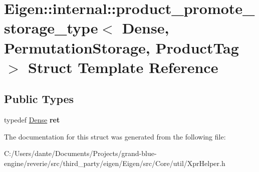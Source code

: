 \hypertarget{struct_eigen_1_1internal_1_1product__promote__storage__type_3_01_dense_00_01_permutation_storage_00_01_product_tag_01_4}{}\section{Eigen\+::internal\+::product\+\_\+promote\+\_\+storage\+\_\+type$<$ Dense, Permutation\+Storage, Product\+Tag $>$ Struct Template Reference}
\label{struct_eigen_1_1internal_1_1product__promote__storage__type_3_01_dense_00_01_permutation_storage_00_01_product_tag_01_4}
\subsection*{Public Types}
\begin{DoxyCompactItemize}
\item 
\mbox{\label{struct_eigen_1_1internal_1_1product__promote__storage__type_3_01_dense_00_01_permutation_storage_00_01_product_tag_01_4_a2140e11db80fe2c1eb76d7b791d1f7de}} 
typedef \mbox{\hyperlink{struct_eigen_1_1_dense}{Dense}} {\bfseries ret}
\end{DoxyCompactItemize}


The documentation for this struct was generated from the following file\+:\begin{DoxyCompactItemize}
\item 
C\+:/\+Users/dante/\+Documents/\+Projects/grand-\/blue-\/engine/reverie/src/third\+\_\+party/eigen/\+Eigen/src/\+Core/util/Xpr\+Helper.\+h\end{DoxyCompactItemize}
